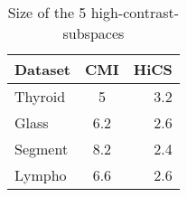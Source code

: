 \documentclass[12pt,a4paper]{scrartcl}
\begin{document}
  
\begin{table}
\begin{center} 
  \begin{tabular}{lcr}
 \hline
  Dataset & CMI & HiCS \\
  \hline
  Thyroid & 5 & 3.2 \\
  Glass & 6.2 & 2.6  \\
  Segment & 8.2 & 2.4\\
  Lympho & 6.6 & 2.6  \\
  \hline
 \end{tabular} 
  \caption { Size of the 5 high-contrast-subspaces}
  \end{center}
\end{table} 
 

 
\end{document}
